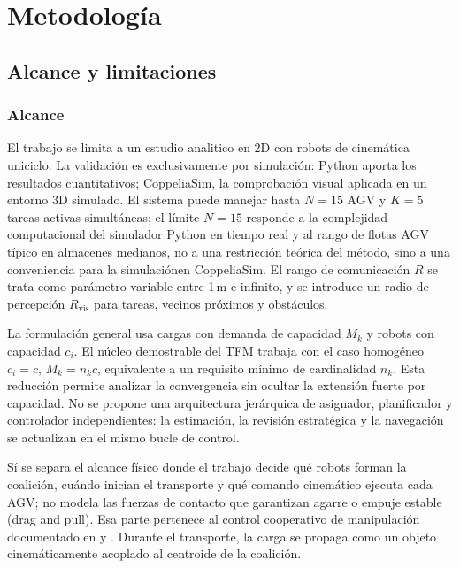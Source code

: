 ﻿%
\section{Metodología}
\label{sec:metodologia}

\subsection{Alcance y limitaciones}
\label{sec:alcance}

\subsubsection{Alcance}

El trabajo se limita a un estudio analitico en 2D con robots de cinemática uniciclo. La validación
es exclusivamente por simulación: Python aporta los resultados cuantitativos; CoppeliaSim,
la comprobación visual aplicada en un entorno 3D simulado. El sistema puede manejar hasta
$N = 15$ AGV y $K = 5$ tareas activas simultáneas; el límite $N = 15$ responde
a la complejidad computacional del simulador Python en tiempo real y al rango de
flotas AGV típico en almacenes medianos, no a una restricción teórica del método, sino a una conveniencia para la simulaciónen CoppeliaSim.
El rango de comunicación $R$ se trata como parámetro variable entre 1\,m e infinito, y
se introduce un radio de percepción $R_{\mathrm{vis}}$ para tareas, vecinos próximos y
obstáculos.

La formulación general usa cargas con demanda de capacidad $M_k$ y robots con capacidad
$c_i$. El núcleo demostrable del TFM trabaja con el caso homogéneo
$c_i=c$, $M_k=n_kc$, equivalente a un requisito mínimo de cardinalidad $n_k$. Esta
reducción permite analizar la convergencia sin ocultar la extensión fuerte por
capacidad. No se propone una arquitectura jerárquica de asignador, planificador y
controlador independientes: la estimación, la revisión estratégica y la navegación se
actualizan en el mismo bucle de control. 

Sí se separa el alcance físico donde el trabajo decide
qué robots forman la coalición, cuándo inician el transporte y qué comando cinemático
ejecuta cada AGV; no modela las fuerzas de contacto que garantizan agarre o empuje
estable (drag and pull). Esa parte pertenece al control cooperativo de manipulación documentado en
\citet{ebel2024cooperative} y \citet{rosenfelder2024force}. Durante el transporte, la
carga se propaga como un objeto cinemáticamente acoplado al centroide de la coalición.

